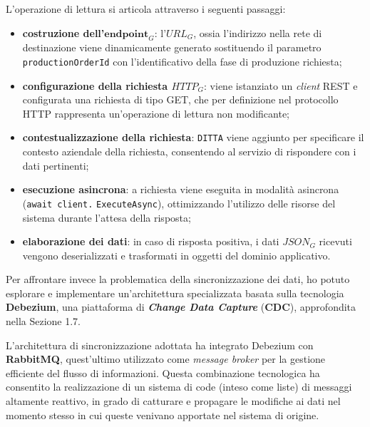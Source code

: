         \vspace{0.2 em}
        \noindent L'operazione di lettura si articola attraverso i seguenti passaggi:
        \begin{itemize}
            \item \textbf{costruzione dell'\textit{$\textbf{endpoint}_G$}}: l'$URL_G$, ossia l'indirizzo nella rete di destinazione viene dinamicamente generato sostituendo il parametro \texttt{productionOrderId} con l'identificativo della fase di produzione richiesta;
            \item \textbf{configurazione della richiesta $HTTP_G$}: viene istanziato un \textit{client} REST e configurata una richiesta di tipo GET, che per definizione nel protocollo HTTP rappresenta un'operazione di lettura non modificante;
            \item \textbf{contestualizzazione della richiesta}: \texttt{DITTA} viene aggiunto per specificare il contesto aziendale della richiesta, consentendo al servizio di rispondere con i dati pertinenti;
            \item \textbf{esecuzione asincrona}: a richiesta viene eseguita in modalità asincrona (\texttt{await client.} 
            \texttt{ExecuteAsync}), ottimizzando l'utilizzo delle risorse del sistema durante l'attesa della risposta;
            \item \textbf{elaborazione dei dati}: in caso di risposta positiva, i dati $JSON_G$ ricevuti vengono deserializzati e trasformati in oggetti del dominio applicativo.
        \end{itemize}

        \vspace{0.2 em}
        \noindent Per affrontare invece la problematica della sincronizzazione dei dati, ho potuto esplorare e implementare un'architettura specializzata basata sulla tecnologia \textbf{Debezium}, una piattaforma di \textbf{\textit{Change Data Capture}} (\textbf{CDC}), approfondita nella Sezione 1.7. 

        \vspace{0.2 em}
        \noindent L'architettura di sincronizzazione adottata ha integrato Debezium con \textbf{RabbitMQ}, quest'ultimo utilizzato come \textit{message broker }per la gestione efficiente del flusso di informazioni. Questa combinazione tecnologica ha consentito la realizzazione di un sistema di code (inteso come liste) di messaggi altamente reattivo, in grado di catturare e propagare le modifiche ai dati nel momento stesso in cui queste venivano apportate nel sistema di origine.


